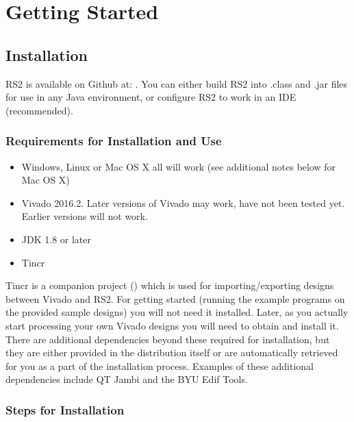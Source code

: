\newpage
\section{Getting Started}

\subsection{Installation}

RS2 is available on Github at:
{}.
You can either build RS2 into .class and .jar files for use in any Java
environment, or configure RS2 to work in an IDE (recommended).

\subsubsection{Requirements for Installation and Use}
\begin{itemize}
  \item Windows, Linux or Mac OS X all will work (see additional notes below for
  Mac OS X)
  \item Vivado 2016.2. Later versions of Vivado may work, have not been tested
  yet. Earlier versions will not work.
  \item JDK 1.8 or later
  \item Tincr 
\end{itemize}

Tincr is a companion project
({}) which is used for
importing/exporting designs between Vivado and RS2.  For getting started (running the example programs on the provided sample designs) you will not need it installed.
Later, as you  actually start processing your own Vivado designs you will need
to obtain and install it. There are additional dependencies beyond these
required for installation, but they are either provided in the distribution
itself or are automatically retrieved for you as a part of the installation process. 
Examples of these additional dependencies include QT Jambi and the BYU Edif
Tools.
 
\subsubsection{Steps for Installation}

